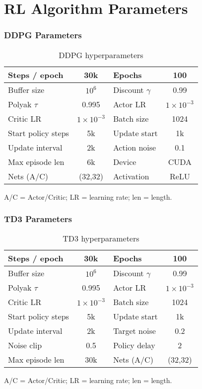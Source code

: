 \section{RL Algorithm Parameters}

\begin{frame}
  \frametitle{DDPG Parameters}
  \footnotesize
  \begin{table}
    \centering
    {\setlength{\tabcolsep}{4pt}\renewcommand{\arraystretch}{1.3}%
      \begin{tabular}{|l|c||l|c|}
      \hline
      Steps / epoch & 30k & Epochs & 100 \\ \hline
      Buffer size & $10^{6}$ & Discount $\gamma$ & 0.99 \\ \hline
      Polyak $\tau$ & 0.995 & Actor LR & $1\!\times\!10^{-3}$ \\ \hline
      Critic LR & $1\!\times\!10^{-3}$ & Batch size & 1024 \\ \hline
      Start policy steps & 5k & Update start & 1k \\ \hline
      Update interval & 2k & Action noise & 0.1 \\ \hline
      Max episode len & 6k & Device & CUDA \\ \hline
      Nets (A/C) & (32,32) & Activation & ReLU \\ \hline
      \end{tabular}
    }
    \caption{DDPG hyperparameters}
    \label{tab:ddpg}
  \end{table}
  {\tiny A/C = Actor/Critic; LR = learning rate; len = length.}
\end{frame}

\begin{frame}
  \frametitle{TD3 Parameters}
  \footnotesize
  \begin{table}
    \centering
    {\setlength{\tabcolsep}{4pt}\renewcommand{\arraystretch}{1.3}%
      \begin{tabular}{|l|c||l|c|}
      \hline
      Steps / epoch & 30k & Epochs & 100 \\ \hline
      Buffer size & $10^{6}$ & Discount $\gamma$ & 0.99 \\ \hline
      Polyak $\tau$ & 0.995 & Actor LR & $1\!\times\!10^{-3}$ \\ \hline
      Critic LR & $1\!\times\!10^{-3}$ & Batch size & 1024 \\ \hline
      Start policy steps & 5k & Update start & 1k \\ \hline
      Update interval & 2k & Target noise & 0.2 \\ \hline
      Noise clip & 0.5 & Policy delay & 2 \\ \hline
      Max episode len & 30k & Nets (A/C) & (32,32) \\ \hline
      \end{tabular}
    }
    \caption{TD3 hyperparameters}
    \label{tab:td3}
  \end{table}
  {\tiny A/C = Actor/Critic; LR = learning rate; len = length.}
\end{frame}

